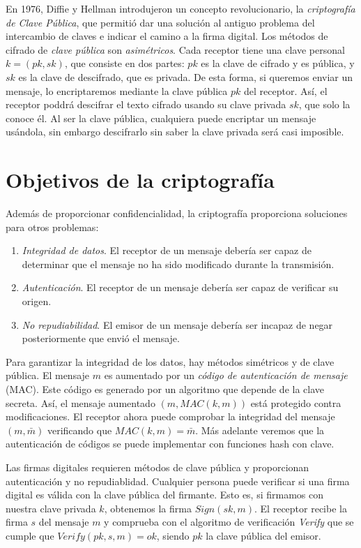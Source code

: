 En 1976, Diffie y Hellman introdujeron un concepto revolucionario, la \emph{criptografía de Clave Pública}, que permitió dar una solución al antiguo problema del intercambio de claves e indicar el camino a la firma digital. Los métodos de cifrado de \emph{clave pública} son \emph{asimétricos}. Cada receptor tiene una clave personal $k = (pk, sk)$, que consiste en dos partes: $pk$ es la clave de cifrado y es pública, y $sk$ es la clave de descifrado, que es privada. De esta forma, si queremos enviar un mensaje, lo encriptaremos mediante la clave pública $pk$ del receptor. Así, el receptor poddrá descifrar el texto cifrado usando su clave privada $sk$, que solo la conoce él. Al ser la clave pública, cualquiera puede encriptar un mensaje usándola, sin embargo descifrarlo sin saber la clave privada será casi imposible.

\section{Objetivos de la criptografía}

Además de proporcionar confidencialidad, la criptografía proporciona soluciones para otros problemas:

\begin{enumerate}
    \item \emph{Integridad de datos}. El receptor de un mensaje debería ser capaz de determinar que el mensaje no ha sido modificado durante la transmisión.
    \item \emph{Autenticación}. El receptor de un mensaje debería ser capaz de verificar su origen.
    \item \emph{No repudiabilidad}. El emisor de un mensaje debería ser incapaz de negar posteriormente que envió el mensaje.
\end{enumerate}

Para garantizar la integridad de los datos, hay métodos simétricos y de clave pública. El mensaje $m$ es aumentado por un \emph{código de autenticación de mensaje} (MAC). Este código es generado por un algoritmo que depende de la clave secreta. Así, el mensaje aumentado $(m, MAC(k,m))$ está protegido contra modificaciones. El receptor ahora puede comprobar la integridad del mensaje $(m, \bar{m})$ verificando que $MAC(k, m) = \bar{m}$. Más adelante veremos que la autenticación de códigos se puede implementar con funciones hash con clave.

Las firmas digitales requieren métodos de clave pública y proporcionan autenticación y no repudiablidad. Cualquier persona puede verificar si una firma digital es válida con la clave pública del firmante. Esto es, si firmamos con nuestra clave privada $k$, obtenemos la firma $Sign(sk, m)$. El receptor recibe la firma $s$ del mensaje $m$ y comprueba con el algoritmo de verificación \emph{Verify} que se cumple que $Verify(pk, s, m) = ok$, siendo $pk$ la clave pública del emisor.

